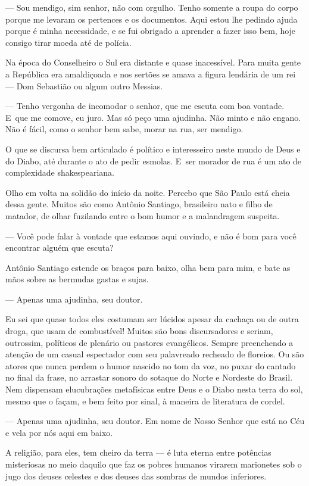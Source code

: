 — Sou mendigo, sim senhor, não com orgulho. Tenho somente a roupa do
corpo porque me levaram os pertences e os documentos. Aqui estou lhe
pedindo ajuda porque é minha necessidade, e se fui obrigado a aprender a
fazer isso bem, hoje consigo tirar moeda até de polícia.

Na época do Conselheiro o Sul era distante e quase inacessível. Para
muita gente a República era amaldiçoada e nos sertões se amava a figura
lendária de um rei --- Dom Sebastião ou algum outro Messias.

— Tenho vergonha de incomodar o senhor, que me escuta com boa vontade. E~que me comove, eu juro. Mas só peço uma ajudinha. Não minto e não
engano. Não é fácil, como o senhor bem sabe, morar na rua, ser mendigo.

O que se discursa bem articulado é político e interesseiro neste mundo
de Deus e do Diabo, até durante o ato de pedir esmolas. E~ser morador de
rua é um ato de complexidade shakespeariana.

\asterisc{}

Olho em volta na solidão do início da noite. Percebo que São Paulo está
cheia dessa gente. Muitos são como Antônio Santiago, brasileiro nato e
filho de matador, de olhar fuzilando entre o bom humor e a malandragem
suspeita.

— Você pode falar à vontade que estamos aqui ouvindo, e não é bom para
você encontrar alguém que escuta?

Antônio Santiago estende os braços para baixo, olha bem para mim, e bate
as mãos sobre as bermudas gastas e sujas.

— Apenas uma ajudinha, seu doutor.

Eu sei que quase todos eles costumam ser lúcidos apesar da cachaça ou de
outra droga, que usam de combustível! Muitos são bons discursadores e
seriam, outrossim, políticos de plenário ou pastores evangélicos. Sempre
preenchendo a atenção de um casual espectador com seu palavreado
recheado de floreios. Ou são atores que nunca perdem o humor nascido no
tom da voz, no puxar do cantado no final da frase, no arrastar sonoro do
sotaque do Norte e Nordeste do Brasil. Nem dispensam elucubrações
metafísicas entre Deus e o Diabo nesta terra do sol, mesmo que o façam,
e bem feito por sinal, à maneira de literatura de cordel.

— Apenas uma ajudinha, seu doutor. Em nome de Nosso Senhor que está no
Céu e vela por nós aqui em baixo.

A religião, para eles, tem cheiro da terra --- é luta eterna entre
potências misteriosas no meio daquilo que faz os pobres humanos virarem
marionetes sob o jugo dos deuses celestes e dos deuses das sombras de
mundos inferiores.

